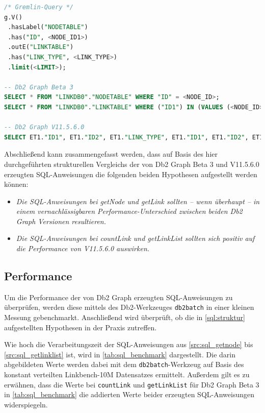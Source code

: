 \begin{lstlisting}[caption={Generierter SQL-Code getLinkList},label=src:sql_getlinklist,language=SQL]
/* Gremlin-Query */
g.V()
 .hasLabel("NODETABLE")
 .has("ID", <NODE_ID1>)
 .outE("LINKTABLE")
 .has("LINK_TYPE", <LINK_TYPE>)
 .limit(<LIMIT>);

-- Db2 Graph Beta 3
SELECT * FROM "LINKDB0"."NODETABLE" WHERE "ID" = <NODE_ID>;
SELECT * FROM "LINKDB0"."LINKTABLE" WHERE ("ID1") IN (VALUES (<NODE_ID>)) AND "LINK_TYPE" = <LINK_TYPE>;

-- Db2 Graph V11.5.6.0
SELECT ET1."ID1", ET1."ID2", ET1."LINK_TYPE", ET1."ID1", ET1."ID2", ET1."VISIBILITY", ET1."LINK_TYPE", ET1."DATA", ET1."ID2", ET1."ID1", ET1."VERSION", ET1."TIME" FROM "LINKDB0"."NODETABLE" AS VT0, "LINKDB0"."LINKTABLE" AS ET1 WHERE VT0."ID" = <NODE_ID> AND ET1."LINK_TYPE" = <LINK_TYPE> AND VT0.ID = ET1.ID1 FETCH FIRST <LIMIT> ROWS ONLY;
\end{lstlisting}

Abschließend kann zusammengefasst werden, dass auf Basis des hier durchgeführten strukturellen Vergleichs der von Db2 Graph Beta 3 und V11.5.6.0 erzeugten SQL-Anweisungen die folgenden beiden Hypothesen aufgestellt werden können:
\begin{itemize}
    \item \textit{Die SQL-Anweisungen bei getNode und getLink sollten -- wenn überhaupt -- in einem vernachlässigbaren Performance-Unterschied zwischen beiden Db2 Graph Versionen resultieren.}
    \item  \textit{Die SQL-Anweisungen bei countLink und getLinkList sollten sich  positiv auf die Performance von V11.5.6.0 auswirken.}
\end{itemize}

\subsection{Performance}
\label{sql:performance}
Um die Performance der von Db2 Graph erzeugten SQL-Anweisungen zu überprüfen, werden diese mittels des Db2-Werkzeuges \texttt{db2batch} in einer kleinen Messung gebenchmarkt. Anschließend wird überprüft, ob die in \autoref{sql:struktur} aufgestellten Hypothesen in der Praxis zutreffen.

Wie hoch die Verarbeitungszeit der SQL-Anweisungen aus \autoref{src:sql_getnode} bis \autoref{src:sql_getlinklist} ist, wird in \autoref{tab:sql_benchmark} dargestellt. Die darin abgebildeten Werte werden dabei mit dem \texttt{db2batch}-Werkzeug auf Basis des konstant verteilten Linkbench-10M Datensatzes ermittelt.  Außerdem gilt es zu erwähnen, dass die Werte bei \texttt{countLink} und \texttt{getLinkList} für Db2 Graph Beta 3 in \autoref{tab:sql_benchmark} die addierten Werte beider erzeugten SQL-Anweisungen widerspiegeln. 

